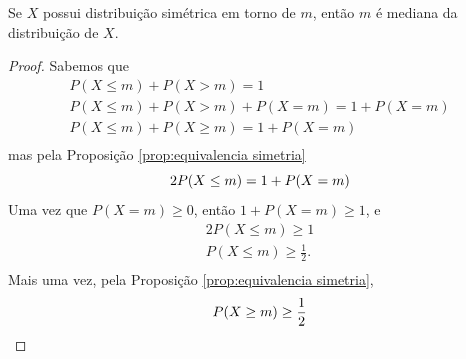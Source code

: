 \begin{prop:simetria e mediana}
Se $X$ possui distribuição simétrica em torno de $m$, então $m$ é mediana da distribuição
de $X$.
\end{prop:simetria e mediana}
\begin{proof}
Sabemos que
\begin{gather*}
	P(X \le m) + P(X > m) = 1 \\
	P(X \le m) + P(X > m) + P(X = m) = 1 + P(X = m) \\
	P(X \le m) + P(X \ge m) = 1 + P(X = m) \\
\end{gather*}
mas pela Proposição \ref{prop:equivalencia simetria}
\[
    2P(X \le m) = 1 + P(X = m) \\
\]
Uma vez que $P(X = m) \ge 0$, então $1 + P(X = m) \ge 1$, e
\begin{gather*}
    2P(X \le m) \ge 1 \\
    P(X \le m) \ge \frac 1 2. \\
\end{gather*}
Mais uma vez, pela Proposição \ref{prop:equivalencia simetria},
\[
    P(X \ge m) \ge \frac 1 2 \\
\]
\end{proof}

